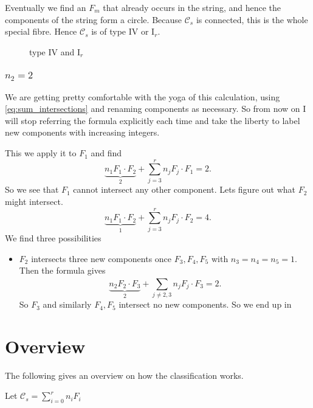 \documentclass[a4paper]{article}
\begin{document}
Eventually we find an $F_m$ that already occurs in the string, and hence the components of the string form a circle. Because $\mathcal{C} _s$ is connected, this is the whole special fibre.  Hence $\mathcal{C} _s $ is of type $\text{IV}$ or $\text{I}_{r}$. 

\begin{figure}[ht]
    \centering
    \caption{type IV and $\text{I}_r$}
    \label{fig:type-iv-and-ir}
\end{figure}

\subsubsection{$n_2 = 2$} 
We are getting pretty comfortable with the yoga of this calculation,  using \eqref{eq:sum_intersections} and renaming components as necessary. So from now on I will stop referring the formula explicitly each time and take the liberty to label new components with increasing integers.

This we apply it to $F_1$ and find \[
	\underbrace{n_1 F_1 \cdot  F_2}_{2} + \sum_{j = 3}^{r} n_j F_j\cdot F_1 = 2
.\] 
So we see that $F_1$ cannot intersect any other component. 
Lets figure out what $F_2$ might intersect. 
\[
	\underbrace{n_1 F_1 \cdot F_2}_1 + \sum_{j = 3}^{r} n_j F_j \cdot F_2 = 4
.\] 
We find three possibilities
\begin{itemize}
	\item $F_2$ intersects three new components once $F_3, F_4, F_5$ with $n_3 = n_4 = n_5 = 1$. 
		Then the formula gives \[
			\underbrace{n_2F_2 \cdot  F_3}_{2} + \sum_{j \ne 2,3}^{}n_j F_j \cdot  F_3 = 2 
		.\] 
		So $F_3$ and similarly $F_4, F_5$ intersect no new components. So we end up in 
\end{itemize}



\section{Overview} \label{sec:overview}
The following gives an overview on how the classification works. 


Let $\mathcal{C} _s = \sum_{i = 0}^{r} n_i F_i $
\end{document}
